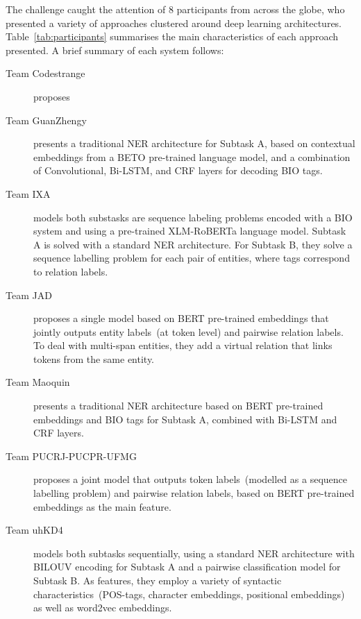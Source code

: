 \documentclass[a4paper,11pt,twocolumn,twoside]{article}
\begin{document}
The challenge caught the attention of 8 participants from across the globe,
who presented a variety of approaches clustered around deep learning architectures.
Table~\ref{tab:participants} summarises the main characteristics of each approach presented.
A brief summary of each system follows:

\begin{description}
  \item[Team Codestrange] proposes

  \item[Team GuanZhengy~\cite{guanzhengyi}] presents a traditional NER architecture for Subtask A, based on contextual embeddings from a BETO pre-trained language model, and a combination of Convolutional, Bi-LSTM, and CRF layers for decoding BIO tags.

  \item[Team IXA~\cite{ixa}] models both substasks are sequence labeling problems encoded with a BIO system and using a pre-trained XLM-RoBERTa language model. Subtask A is solved with a standard NER architecture. For Subtask B, they solve a sequence labelling problem for each pair of entities, where tags correspond to relation labels.

  \item[Team JAD~\cite{jad}] proposes a single model based on BERT pre-trained embeddings that jointly outputs entity labels~(at token level) and pairwise relation labels. To deal with multi-span entities, they add a virtual relation that links tokens from the same entity.

  \item[Team Maoquin~\cite{maoquin}] presents a traditional NER architecture based on BERT pre-trained embeddings and BIO tags for Subtask A, combined with Bi-LSTM and CRF layers.

  \item[Team PUCRJ-PUCPR-UFMG~\cite{pucrj}] proposes a joint model that outputs token labels~(modelled as a sequence labelling problem) and pairwise relation labels, based on BERT pre-trained embeddings as the main feature.

  \item[Team uhKD4~\cite{uhkd4}] models both subtasks sequentially, using a standard NER architecture with BILOUV encoding for Subtask A and a pairwise classification model for Subtask B. As features, they employ a variety of syntactic characteristics~(POS-tags, character embeddings, positional embeddings) as well as word2vec embeddings.


\end{description}
\end{document}
